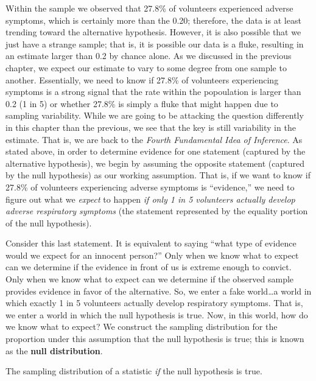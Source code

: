 \documentclass[]{book}
\theoremstyle{plain}
\theoremstyle{mydefn}
\theoremstyle{myexmpl}
\theoremstyle{remark}
\let\BeginKnitrBlock\begin \let\EndKnitrBlock\end
\let\BeginKnitrBlock\begin \let\EndKnitrBlock\end
\begin{document}
Within the sample we observed that 27.8\% of volunteers experienced
adverse symptoms, which is certainly more than the 0.20; therefore, the
data is at least trending toward the alternative hypothesis. However, it
is also possible that we just have a strange sample; that is, it is
possible our data is a fluke, resulting in an estimate larger than 0.2
by chance alone. As we discussed in the previous chapter, we expect our
estimate to vary to some degree from one sample to another. Essentially,
we need to know if 27.8\% of volunteers experiencing symptoms is a
strong signal that the rate within the popoulation is larger than 0.2 (1
in 5) or whether 27.8\% is simply a fluke that might happen due to
sampling variability. While we are going to be attacking the question
differently in this chapter than the previous, we see that the key is
still variability in the estimate. That is, we are back to the
\emph{Fourth Fundamental Idea of Inference}. As stated above, in order
to determine evidence for one statement (captured by the alternative
hypothesis), we begin by assuming the opposite statement (captured by
the null hypothesis) as our working assumption. That is, if we want to
know if 27.8\% of volunteers experiencing adverse symptoms is
``evidence,'' we need to figure out what we \emph{expect} to happen
\emph{if only 1 in 5 volunteers actually develop adverse respiratory
symptoms} (the statement represented by the equality portion of the null
hypothesis).

Consider this last statement. It is equivalent to saying ``what type of
evidence would we expect for an innocent person?'' Only when we know
what to expect can we determine if the evidence in front of us is
extreme enough to convict. Only when we know what to expect can we
determine if the observed sample provides evidence in favor of the
alternative. So, we enter a fake world\ldots{}a world in which exactly 1
in 5 volunteers actually develop respiratory symptoms. That is, we enter
a world in which the null hypothesis is true. Now, in this world, how do
we know what to expect? We construct the sampling distribution for the
proportion under this assumption that the null hypothesis is true; this
is known as the \textbf{null distribution}.

\BeginKnitrBlock{definition}[Null Distribution]
\protect\hypertarget{def:defn-null-distribution}{}{\label{def:defn-null-distribution}
{} }The sampling distribution of a
statistic \emph{if} the null hypothesis is true.
\EndKnitrBlock{definition}
\end{document}
